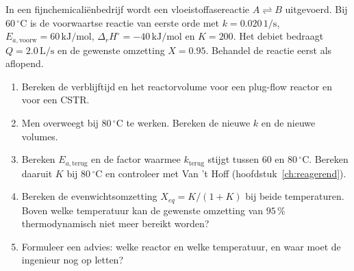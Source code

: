 \begin{oefening}
In een fijnchemicaliënbedrijf wordt een vloeistoffasereactie \(A \rightleftharpoons B\) uitgevoerd. Bij \(60\,^\circ\mathrm{C}\) is de voorwaartse reactie van eerste orde met \(k = 0.020\,\mathrm{1/s}\), \(E_{a,\text{voorw}} = 60\,\mathrm{kJ/mol}\), \(\Delta_rH^\circ = -40\,\mathrm{kJ/mol}\) en \(K = 200\). Het debiet bedraagt \(Q = 2.0\,\mathrm{L/s}\) en de gewenste omzetting \(X = 0.95\). Behandel de reactie eerst als aflopend.

\begin{enumerate}
\item[(a)]
  Bereken de verblijftijd en het reactorvolume voor een plug-flow reactor en voor een CSTR.
\item[(b)]
  Men overweegt bij \(80\,^\circ\mathrm{C}\) te werken. Bereken de nieuwe \(k\) en de nieuwe volumes.
\item[(c)]
  Bereken \(E_{a,\text{terug}}\) en de factor waarmee \(k_{\text{terug}}\) stijgt tussen \(60\) en \(80\,^\circ\mathrm{C}\). Bereken daaruit \(K\) bij \(80\,^\circ\mathrm{C}\) en controleer met Van 't Hoff (hoofdstuk~\ref{ch:reagerend}).
\item[(d)]
  Bereken de evenwichtsomzetting \(X_{eq} = K/(1 + K)\) bij beide temperaturen. Boven welke temperatuur kan de gewenste omzetting van \(95\,\%\) thermodynamisch niet meer bereikt worden?
\item[(e)]
  Formuleer een advies: welke reactor en welke temperatuur, en waar moet de ingenieur nog op letten?
\end{enumerate}
\end{oefening}
